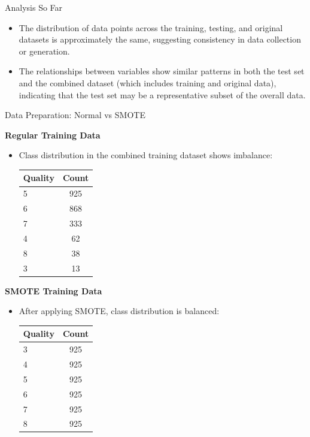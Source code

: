 \documentclass[
 size=14pt,
 paper=smartboard,  %
 mode=present, 		%
 display=slides, 	%
 style=tuliplab,  	%
 pauseslide,
 fleqn,leqno]{powerdot}
\begin{document}
\begin{slide}{Analysis So Far}
	\begin{itemize}
		\item The distribution of data points across the training, testing, and original datasets is approximately the same, suggesting consistency in data collection or generation.
		\item The relationships between variables show similar patterns in both the test set and the combined dataset (which includes training and original data), indicating that the test set may be a representative subset of the overall data.
	\end{itemize}
\end{slide}
\begin{slide}[toc=]{Data Preparation: Normal vs SMOTE}
	\begin{minipage}[t]{0.48\textwidth}
		\textbf{Regular Training Data}
		\begin{itemize}
			\item Class distribution in the combined training dataset shows imbalance:
			
			\begin{tabular}{lc}
				\textbf{Quality} & \textbf{Count} \\
				\hline
				5 & 925 \\
				6 & 868 \\
				7 & 333 \\
				4 & 62  \\
				8 & 38  \\
				3 & 13  \\
			\end{tabular}
		\end{itemize}
	\end{minipage}
	\hfill
	\begin{minipage}[t]{0.48\textwidth}
		\textbf{SMOTE Training Data}
		\begin{itemize}
			\item After applying SMOTE, class distribution is balanced:
			
			\begin{tabular}{lc}
				\textbf{Quality} & \textbf{Count} \\
				\hline
				3 & 925 \\
				4 & 925 \\
				5 & 925 \\
				6 & 925 \\
				7 & 925 \\
				8 & 925 \\
			\end{tabular}
		\end{itemize}
	\end{minipage}
\end{slide}
\end{document}

